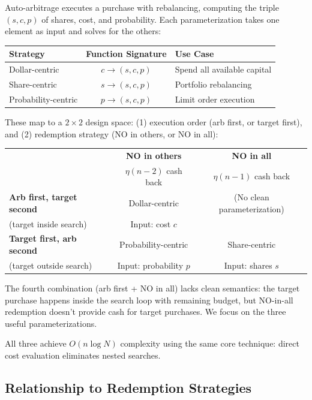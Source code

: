 \documentclass[11pt]{article}
\begin{document}
Auto-arbitrage executes a purchase with rebalancing, computing the triple $(s, c, p)$ of shares, cost, and probability. Each parameterization takes one element as input and solves for the others:

\begin{center}
\begin{tabular}{l|c|l}
\textbf{Strategy} & \textbf{Function Signature} & \textbf{Use Case} \\
\hline
Dollar-centric & $c \to (s, c, p)$ & Spend all available capital \\
Share-centric & $s \to (s, c, p)$ & Portfolio rebalancing \\
Probability-centric & $p \to (s, c, p)$ & Limit order execution \\
\end{tabular}
\end{center}

These map to a $2 \times 2$ design space: (1) execution order (arb first, or target first), and (2) redemption strategy (NO in others, or NO in all):

\begin{center}
\begin{tabular}{l|c|c}
& \textbf{NO in others} & \textbf{NO in all} \\
& $\eta(n-2)$ cash back & $\eta(n-1)$ cash back \\
\hline
\textbf{Arb first, target second} & Dollar-centric & (No clean parameterization) \\
(target inside search) & Input: cost $c$ & \\
\hline
\textbf{Target first, arb second} & Probability-centric & Share-centric \\
(target outside search) & Input: probability $p$ & Input: shares $s$ \\
\end{tabular}
\end{center}

The fourth combination (arb first + NO in all) lacks clean semantics: the target purchase happens inside the search loop with remaining budget, but NO-in-all redemption doesn't provide cash for target purchases. We focus on the three useful parameterizations.

All three achieve $O(n \log N)$ complexity using the same core technique: direct cost evaluation eliminates nested searches.

\subsection{Relationship to Redemption Strategies}
\label{sec:design}
\end{document}
